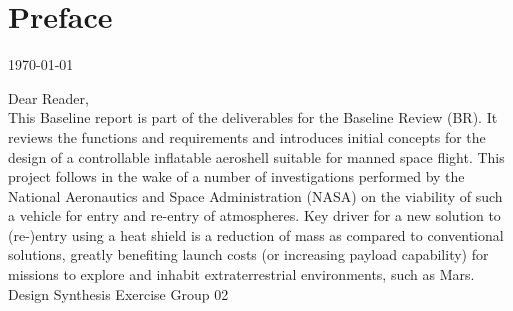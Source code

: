 \section*{Preface}\label{cha:preface}

\begin{flushright}
	\today
\end{flushright}

Dear Reader,	
\\ [1cm]
This Baseline report is part of the deliverables for the Baseline Review (BR). It reviews the functions and requirements and introduces initial concepts for the design of a controllable inflatable aeroshell suitable for manned space flight. This project follows in the wake of a number of investigations performed by the National Aeronautics and Space Administration (NASA) on the viability of such a vehicle for entry and re-entry of atmospheres. Key driver for a new solution to (re-)entry using a heat shield is a reduction of mass as compared to conventional solutions, greatly benefiting launch costs (or increasing payload capability) for missions to explore and inhabit extraterrestrial environments, such as Mars. 
\\ [1.5cm]
Design Synthesis Exercise Group 02